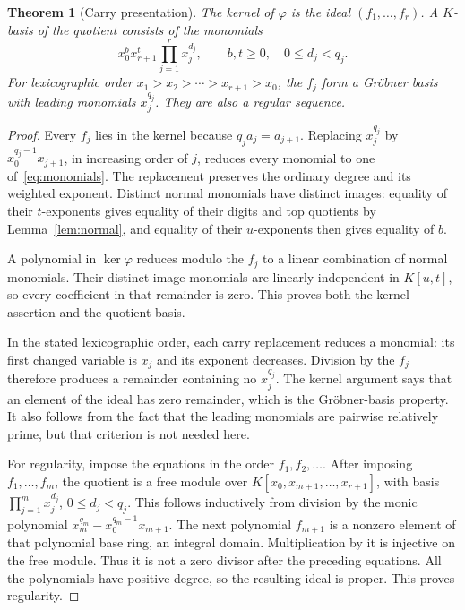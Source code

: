 \documentclass[11pt]{article}
\numberwithin{equation}{section}
\newtheorem{theorem}{Theorem}[section]
\theoremstyle{definition}
\theoremstyle{remark}\newtheorem{remark}[theorem]{Remark}
\begin{document}
\begin{theorem}[Carry presentation]\label{thm:ideal}
The kernel of $\varphi$ is the ideal $(f_1,\ldots,f_r)$.
A $K$-basis of the quotient consists of the monomials
\begin{equation}\label{eq:monomials}
 x_0^b x_{r+1}^t\prod_{j=1}^r x_j^{d_j},
 \qquad b,t\ge0,\quad 0\le d_j<q_j.
\end{equation}
For lexicographic order
$x_1>x_2>\cdots>x_{r+1}>x_0$, the $f_j$ form a Gr\"obner basis with
leading monomials $x_j^{q_j}$.  They are also a regular sequence.
\end{theorem}
\begin{proof}
Every $f_j$ lies in the kernel because $q_j a_j=a_{j+1}$.
Replacing $x_j^{q_j}$ by $x_0^{q_j-1}x_{j+1}$, in increasing order of $j$,
reduces every monomial to one of~\eqref{eq:monomials}.  The replacement
preserves the ordinary degree and its weighted exponent.
Distinct normal monomials have distinct images: equality of their
$t$-exponents gives equality of their digits and top quotients by
Lemma~\ref{lem:normal}, and equality of their $u$-exponents then gives
equality of $b$.

A polynomial in $\ker\varphi$ reduces modulo the $f_j$ to a linear
combination of normal monomials.  Their distinct image monomials are
linearly independent in $K[u,t]$, so every coefficient in that remainder
is zero.  This proves both the kernel assertion and the quotient basis.

In the stated lexicographic order, each carry replacement reduces a
monomial: its first changed variable is $x_j$ and its exponent decreases.
Division by the $f_j$ therefore produces a remainder containing no
$x_j^{q_j}$.  The kernel argument says that an element of the ideal has
zero remainder, which is the Gr\"obner-basis property.  It also follows
from the fact that the leading monomials are pairwise relatively prime,
but that criterion is not needed here.

For regularity, impose the equations in the order $f_1,f_2,\ldots$.
After imposing $f_1,\ldots,f_m$, the quotient is a free module over
$K[x_0,x_{m+1},\ldots,x_{r+1}]$, with basis
$\prod_{j=1}^m x_j^{d_j}$, $0\le d_j<q_j$.
This follows inductively from division by the monic polynomial
$x_m^{q_m}-x_0^{q_m-1}x_{m+1}$.
The next polynomial $f_{m+1}$ is a nonzero element of that polynomial
base ring, an integral domain.  Multiplication by it is injective on the
free module.  Thus it is not a zero divisor after the preceding equations.
All the polynomials have positive degree, so the resulting ideal is proper.
This proves regularity.
\end{proof}
\end{document}
